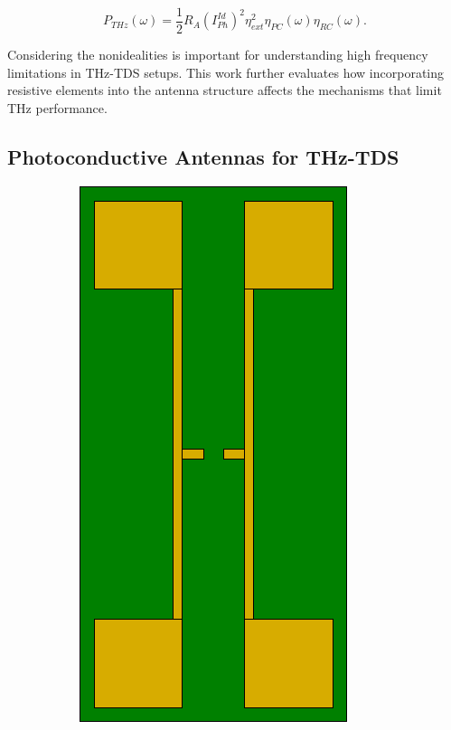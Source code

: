 \begin{equation}
    P_{THz}(\omega) = \frac{1}{2}R_A(I_{Ph}^{Id})^2\eta_{ext}^2\eta_{PC}(\omega)\eta_{RC}(\omega).
    \label{eq_power}
\end{equation}

Considering the nonidealities is important for understanding high frequency limitations in THz-TDS setups. This work further evaluates how incorporating resistive elements into the antenna structure affects the mechanisms that limit THz performance. 


\subsection{Photoconductive Antennas for THz-TDS}

\begin{figure}[!]
    \centering
    \begin{minipage}{0.75\textwidth} 
        \centering
        \begin{subfigure}[t]{0.45\textwidth}
            \centering
            \includegraphics[height=0.32\textheight]{figures/typ_PCA_antenna.pdf}
            \caption{\centering}

\end{subfigure}
\end{minipage}
\end{figure}
